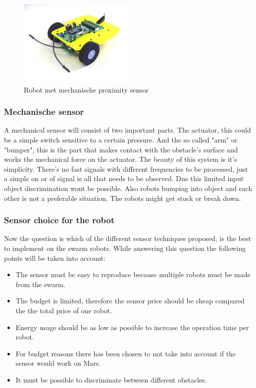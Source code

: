 \documentclass[10pt,a4paper]{article}
\begin{document}
\begin{figure}[!ht]

  \centering
      \includegraphics[width=0.5\textwidth]{voelsprieten.jpg}
  \caption{Robot met mechanische proximity sensor}  \label{voelspriet}
 
\end{figure}

\subsubsection{Mechanische sensor}
A mechanical sensor will consist of two important parts. The actuator, this could be a simple switch sensitive to a certain pressure. And the so called "arm" or "bumper", this is the part that makes contact with the obstacle's surface and works the mechanical force on the actuator. The beauty of this system is it's simplicity. There's no fast signals with different frequencies to be processed, just a simple on or of signal is all that needs to be observed. Due this limited input object discrimination wont be possible. Also robots bumping into object and each other is not a preferable situation. The robots might get stuck or break down.



\subsubsection{Sensor choice for the robot}
Now the question is which of the different sensor techniques proposed, is the best to implement on the swarm robots. While answering this question the following points will be taken into account:

\begin{itemize}
    \item The sensor must be easy to reproduce because multiple robots must be made from the swarm.
    \item The budget is limited, therefore the sensor price should be cheap compared the the total price of one robot.
    \item Energy usage should be as low as possible to increase the operation time per robot.
    \item For budget reasons there has been chosen to not take into account if the sensor would work on Mars.
    \item It must be possible to discriminate between different obstacles.
\end{itemize}
\end{document}
